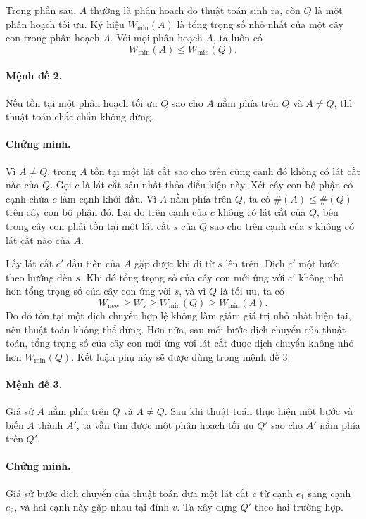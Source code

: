 \documentclass[11pt]{article}
\begin{document}
Trong phần sau, $A$ thường là phân hoạch do thuật toán sinh ra, còn $Q$ là
một phân hoạch tối ưu. Ký hiệu $W_{\min}(A)$ là tổng trọng số nhỏ nhất của một
cây con trong phân hoạch $A$. Với mọi phân hoạch $A$, ta luôn có
\[
  W_{\min}(A)\le W_{\min}(Q).
\]

\paragraph{Mệnh đề 2.}
Nếu tồn tại một phân hoạch tối ưu $Q$ sao cho $A$ nằm phía trên $Q$ và
$A\ne Q$, thì thuật toán chắc chắn không dừng.

\paragraph{Chứng minh.}
Vì $A\ne Q$, trong $A$ tồn tại một lát cắt sao cho trên cùng cạnh đó không có
lát cắt nào của $Q$. Gọi $c$ là lát cắt sâu nhất thỏa điều kiện này. Xét cây
con bộ phận có cạnh chứa $c$ làm cạnh khởi đầu. Vì $A$ nằm phía trên $Q$, ta
có $\#(A)\le \#(Q)$ trên cây con bộ phận đó. Lại do trên cạnh của $c$ không có
lát cắt của $Q$, bên trong cây con phải tồn tại một lát cắt $s$ của $Q$ sao
cho trên cạnh của $s$ không có lát cắt nào của $A$.

Lấy lát cắt $c'$ đầu tiên của $A$ gặp được khi đi từ $s$ lên trên. Dịch
$c'$ một bước theo hướng đến $s$. Khi đó tổng trọng số của cây con mới ứng với
$c'$ không nhỏ hơn tổng trọng số của cây con ứng với $s$, và vì $Q$ là tối ưu,
ta có
\[
  W_{\text{new}}\ge W_s\ge W_{\min}(Q)\ge W_{\min}(A).
\]
Do đó tồn tại một dịch chuyển hợp lệ không làm giảm giá trị nhỏ nhất hiện tại,
nên thuật toán không thể dừng. Hơn nữa, sau mỗi bước dịch chuyển của thuật
toán, tổng trọng số của cây con mới ứng với lát cắt được dịch chuyển không
nhỏ hơn $W_{\min}(Q)$. Kết luận phụ này sẽ được dùng trong mệnh đề 3.

\paragraph{Mệnh đề 3.}
Giả sử $A$ nằm phía trên $Q$ và $A\ne Q$. Sau khi thuật toán thực hiện một bước
và biến $A$ thành $A'$, ta vẫn tìm được một phân hoạch tối ưu $Q'$ sao cho
$A'$ nằm phía trên $Q'$.

\paragraph{Chứng minh.}
Giả sử bước dịch chuyển của thuật toán đưa một lát cắt $c$ từ cạnh $e_1$ sang
cạnh $e_2$, và hai cạnh này gặp nhau tại đỉnh $v$. Ta xây dựng $Q'$ theo hai
trường hợp.
\end{document}
